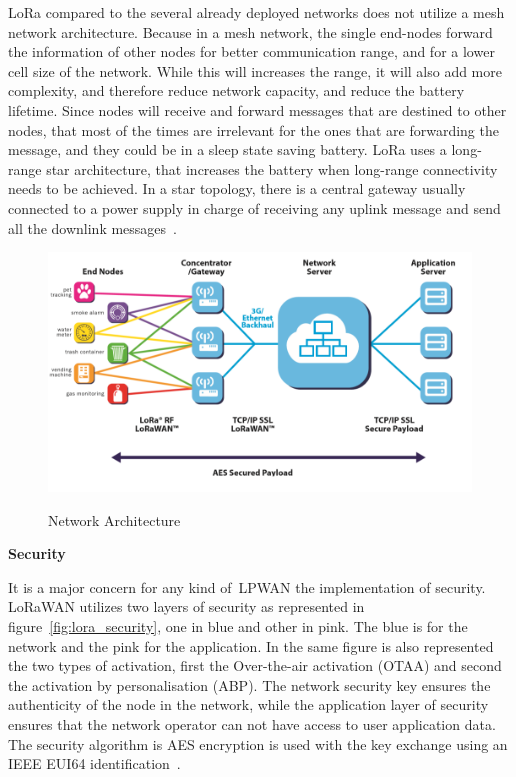 LoRa compared to the several already deployed networks does not utilize a mesh network architecture. Because in a mesh network, the single end-nodes forward the information of other nodes for better communication range, and for a lower cell size of the network. While this will increases the range, it will also add more complexity, and therefore reduce network capacity, and reduce the  battery lifetime. Since nodes will receive and forward messages that are destined to other nodes, that most of the times are irrelevant for the ones that are forwarding the message, and they could be in a sleep state saving battery. LoRa uses a long-range star architecture, that increases the battery when long-range connectivity needs to be achieved. In a star topology, there is a central gateway usually connected to a power supply in charge of receiving any uplink message and send all the downlink messages~\cite{LPLoRaAlliance2018}.
\begin{figure}[htbp]
  \centering
    {\includegraphics[height=2.3 in,width=0.8\linewidth]{Chapters/Figures/loranetwork.PNG}}%
  \caption{Network Architecture~\cite{LPLoRaAlliance2018}}
  \label{fig:lora_network_a}
\end{figure}

\textbf{Security }

It is a major concern for any kind of~\gls{LPWAN} the implementation of security. LoRaWAN utilizes two layers of security as represented in figure~\ref{fig:lora_security}, one in blue and other in pink. The blue is for the network and the pink for the application. In the same figure is also represented the two types of activation, first the Over-the-air activation (OTAA) and second the activation by personalisation (ABP).
The network security key ensures the authenticity  of the node in the network, while the application layer of security ensures that the network operator can not have access to user application data. The security algorithm is AES encryption is used with the key exchange using an IEEE EUI64 identification~\cite{Navarro-Ortiz2018}. \newline\newline
 
